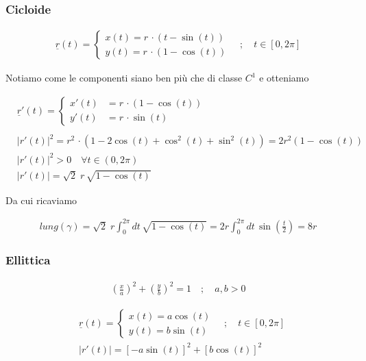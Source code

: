 \subsubsection{Cicloide}

\begin{align}
\underline{r}(t)=\left\{
\begin{array}{cc}
x(t)= r \, \cdot (t-\sin(t)) \\
y(t)= r \, \cdot (1-\cos(t))
\end{array}
\right. \quad ; \quad t \in [0,2\pi]
\end{align}

Notiamo come le componenti siano ben più che di classe $C^1$ e otteniamo

\begin{align}
{}&\underline{r}'(t)=\left\{
\begin{array}{cc}
x'(t) {}&= r \, \cdot (1-\cos(t)) \\
y'(t) &= r \, \cdot \sin(t) \qquad \;\,\,
\end{array}
\right. \\
\nonumber \\
&|r'(t)|^2= r^2 \, \cdot (1 - 2\cos(t) + \cos^2(t) + \sin^2(t))=2r^2(1-\cos(t))\\
&|r'(t)|^2 >0 \quad \forall t \in (0,2\pi) \\
& |r'(t)|= \sqrt{2} \; r \, \sqrt{1-\cos(t)}
\end{align}

Da cui ricaviamo 

\begin{align}
lung(\gamma)= \sqrt{2} \; r \int_{0}^{2\pi}dt \, \sqrt{1-\cos(t)} = 2r   \int_{0}^{2\pi} dt \, \sin\left(\frac{t}{2}\right) = 8 r
\end{align}

\subsubsection{Ellittica}

\begin{align}
\left(
\frac{x}{a}
\right)^2 + \left(
\frac{y}{b}
\right)^2=1 \quad ; \quad a,b>0
\end{align}

\begin{align}
{}&\underline{r}(t)=\left\{
\begin{array}{cc}
x(t)= a \cos(t) \\
y(t)= b \sin(t)
\end{array}
\right. \quad ; \quad t \in [0,2\pi]\\
&|r'(t)|= [-a \sin(t)]^2 + [b \cos(t)]^2
\end{align}

